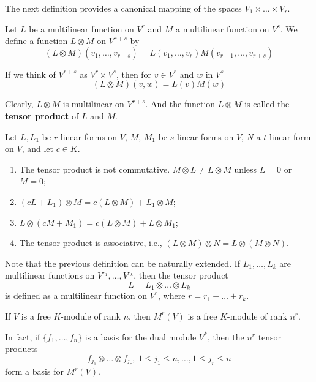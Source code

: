 The next definition provides a canonical mapping of the spaces $V_1 \times \ldots \times V_r$.

\begin{definition}
	Let $L$ be a multilinear function on $V^r$ and $M$ a multilinear function on $V^s$. We define a function $L \otimes M$ on $V^{r+s}$ by
	\[
		(L \otimes M)(v_1, \ldots, v_{r+s}) = L(v_1, \ldots, v_r) M (v_{r+1}, \ldots, v_{r+s})
	\]
	
	If we think of $V^{r+s}$ as $V^r \times V^s$, then for $v \in V^r$ and $w$ in $V^s$
	\[
		(L \otimes M)(v, w) = L(v)M(w)
	\]
	
	Clearly, $L \otimes M$ is multilinear on $V^{r+s}$. And the function $L \otimes M$ is called the \textbf{tensor product} of $L$ and $M$.
\end{definition}

\begin{lemma}
	Let $L, L_1$ be $r$-linear forms on $V$, $M$, $M_1$ be $s$-linear forms on $V$, $N$ a $t$-linear form on $V$, and let $c \in K$.
	
	\begin{enumerate}
		\item The tensor product is not commutative. $M \otimes L \neq L \otimes M$ unless $L = 0$ or $M = 0$;
		\item $(cL+L_1) \otimes M = c(L \otimes M) + L_1 \otimes M$;
		\item $L \otimes (cM + M_1) = c(L \otimes M) + L \otimes M_1$;
		\item The tensor product is associative, i.e., $(L \otimes M) \otimes N = L \otimes (M \otimes N)$.
	\end{enumerate}
\end{lemma}

Note that the previous definition can be naturally extended. If $L_1, \ldots, L_k$ are multilinear functions on $V^{r_1}, \ldots, V^{r_k}$, then the tensor product
\[
	L = L_1 \otimes \ldots \otimes L_k
\]
is defined as a multilinear function on $V^r$, where $r = r_1 + \ldots + r_k$.

\begin{theorem}
	If $V$ is a free $K$-module of rank $n$, then $M^r(V)$ is a free $K$-module of rank $n^r$.
	
	In fact, if $\{ f_1, \ldots, f_n \}$ is a basis for the dual module $V^\ast$, then the $n^r$ tensor products
	\[
		f_{j_1} \otimes \ldots \otimes f_{j_r}, ~1 \leq j_1 \leq n, \ldots, 1 \leq j_r \leq n
	\]
	form a basis for $M^r(V)$.
\end{theorem}

